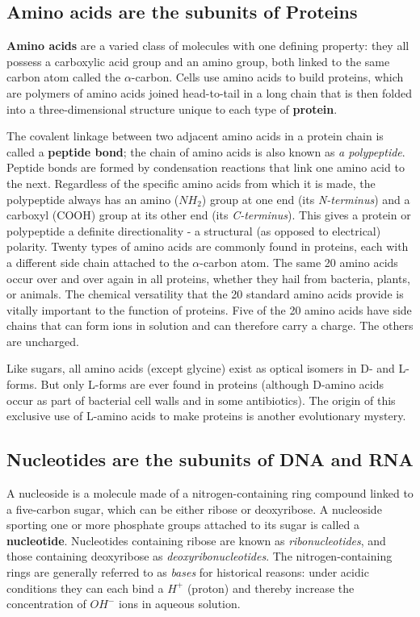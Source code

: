 \subsection{Amino acids are the subunits of Proteins}

\textbf{Amino acids} are a varied class of molecules with one defining property:
they all possess a carboxylic acid group and an amino group, both
linked to the same carbon atom called the $\alpha$-carbon.
Cells use amino acids to build proteins, which are polymers of
amino acids joined head-to-tail in a long chain that is then folded into a
three-dimensional structure unique to each type of \textbf{protein}.

The covalent linkage between two adjacent amino acids in a protein
chain is called a \textbf{peptide bond}; the chain of amino acids is also known as
\textit{a polypeptide}. Peptide bonds are formed by condensation
reactions that link one amino acid to the next. Regardless of the specific
amino acids from which it is made, the polypeptide always has an amino
($NH_{2}$) group at one end (its \textit{N-terminus}) and a carboxyl (COOH) group at
its other end (its \textit{C-terminus}). This gives a protein or polypeptide a definite
directionality - a structural (as opposed to electrical) polarity.
Twenty types of amino acids are commonly found in proteins, each with a
different side chain attached to the $\alpha$-carbon atom.
The same 20 amino acids occur over and over again in all proteins,
whether they hail from bacteria, plants, or animals.
The chemical versatility that the 20 standard amino acids provide is
vitally important to the function of proteins. Five of the 20 amino acids
have side chains that can form ions in solution and can therefore carry
a charge. The others are uncharged.

Like sugars, all amino acids (except glycine) exist as optical isomers in D-
and L-forms. But only L-forms are ever found in proteins
(although D-amino acids occur as part of bacterial cell walls and in some
antibiotics). The origin of this exclusive use of L-amino acids to make
proteins is another evolutionary mystery.

\subsection{Nucleotides are the subunits of DNA and RNA}

A nucleoside is a molecule made of a nitrogen-containing ring compound
linked to a five-carbon sugar, which can be either ribose or deoxyribose.
A nucleoside sporting one or more phosphate
groups attached to its sugar is called a \textbf{nucleotide}. Nucleotides containing
ribose are known as \textit{ribonucleotides}, and those containing deoxyribose as
\textit{deoxyribonucleotides}.
The nitrogen-containing rings are generally referred to as \textit{bases} for historical
reasons: under acidic conditions they can each bind a $H^{+}$ (proton)
and thereby increase the concentration of $OH^{-}$ ions in aqueous solution.

